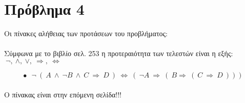 \documentclass[10pt]{article}
\begin{document}
\section*{Πρόβλημα 4}

\vspace{5mm}

Οι πίνακες αλήθειας των προτάσεων του προβλήματος:\\ \\
Σύμφωνα με το βιβλίο σελ. 253 η προτεραιότητα των τελεστών είναι η εξής: $ \ \neg, \ \wedge, \ \vee, \ \Rightarrow, \ \Leftrightarrow$ 

\vspace{5mm}

\[
\bullet \ \ \  \neg \ ( \ A \ \wedge \ \neg B \ \wedge \  C \ \Rightarrow \ D \ )
\ \Leftrightarrow \ (\ \neg A \ \Rightarrow \ ( \ B \Rightarrow \ ( \ C \ \Rightarrow \ D \ ))) \] \\
Ο πίνακας είναι στην επόμενη σελίδα!!!
\end{document}

